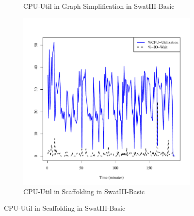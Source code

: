\documentclass[conference]{IEEEtran}
\begin{document}
\begin{figure}[]
\begin{subfigure}[b]{0.25\textwidth}
                \caption{CPU-Util in Graph Simplification in SwatIII-Basic}
                \label{fig:ECCPUHDD}
        \end{subfigure} 
        \begin{subfigure}[b]{0.25\textwidth}
                \includegraphics[width=\textwidth]{Figure/SystemData/Plots/SCFCPUHDD.pdf}
                \caption{CPU-Util in Scaffolding in SwatIII-Basic}
                \label{fig:SCFCPUHDD}
        \end{subfigure}       
        

\end{figure}
\end{document}
